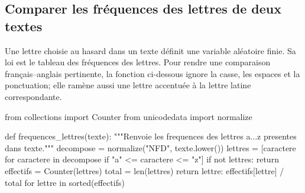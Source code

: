\subsection{Comparer les fréquences des lettres de deux textes}

Une lettre choisie au hasard dans un texte définit une variable aléatoire
finie. Sa loi est le tableau des fréquences des lettres. Pour rendre une
comparaison français--anglais pertinente, la fonction ci-dessous ignore la
casse, les espaces et la ponctuation; elle ramène aussi une lettre accentuée
à la lettre latine correspondante.

\begin{python}
from collections import Counter
from unicodedata import normalize

def frequences_lettres(texte):
    """Renvoie les frequences des lettres a...z presentes dans texte."""
    decompose = normalize("NFD", texte.lower())
    lettres = [caractere for caractere in decompose if "a" <= caractere <= "z"]
    if not lettres:
        return {}
    effectifs = Counter(lettres)
    total = len(lettres)
    return {
        lettre: effectifs[lettre] / total
        for lettre in sorted(effectifs)
    }
\end{python}


%
%
